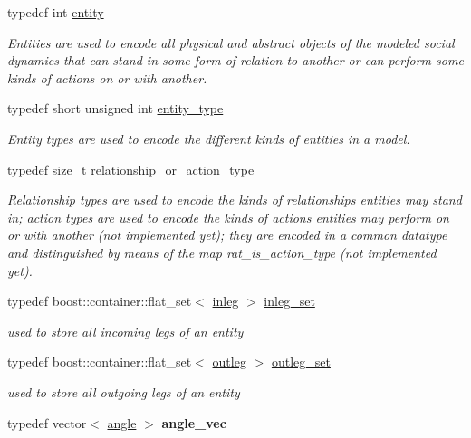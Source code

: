 \begin{DoxyCompactItemize}
typedef int \hyperlink{namespacetricl_a57273122278e8b301844e2a2e1f0742f}{entity}
\begin{DoxyCompactList}\small\item\em Entities are used to encode all physical and abstract objects of the modeled social dynamics that can stand in some form of relation to another or can perform some kinds of actions on or with another. \end{DoxyCompactList}\item 
typedef short unsigned int \hyperlink{namespacetricl_afd4de3aedd5e48cf955f03457386e98f}{entity\+\_\+type}
\begin{DoxyCompactList}\small\item\em Entity types are used to encode the different kinds of entities in a model. \end{DoxyCompactList}\item 
typedef size\+\_\+t \hyperlink{namespacetricl_a2d01894944fb58a8fedc0912a48d13f8}{relationship\+\_\+or\+\_\+action\+\_\+type}
\begin{DoxyCompactList}\small\item\em Relationship types are used to encode the kinds of relationships entities may stand in; action types are used to encode the kinds of actions entities may perform on or with another (not implemented yet); they are encoded in a common datatype and distinguished by means of the map rat\+\_\+is\+\_\+action\+\_\+type (not implemented yet). \end{DoxyCompactList}\item 
\mbox{\label{namespacetricl_a024e365a54b0a7ed2094f9d452d52a84}} 
typedef boost\+::container\+::flat\+\_\+set$<$ \hyperlink{structtricl_1_1inleg}{inleg} $>$ \hyperlink{namespacetricl_a024e365a54b0a7ed2094f9d452d52a84}{inleg\+\_\+set}
\begin{DoxyCompactList}\small\item\em used to store all incoming legs of an entity \end{DoxyCompactList}\item 
\mbox{\label{namespacetricl_ab38d0de463e15641fa11e175c60a265e}} 
typedef boost\+::container\+::flat\+\_\+set$<$ \hyperlink{structtricl_1_1outleg}{outleg} $>$ \hyperlink{namespacetricl_ab38d0de463e15641fa11e175c60a265e}{outleg\+\_\+set}
\begin{DoxyCompactList}\small\item\em used to store all outgoing legs of an entity \end{DoxyCompactList}\item 
\mbox{\label{namespacetricl_a3de3d7b28165426ea812bd7d6096540a}} 
typedef vector$<$ \hyperlink{structtricl_1_1angle}{angle} $>$ {\bfseries angle\+\_\+vec}
\end{DoxyCompactItemize}
